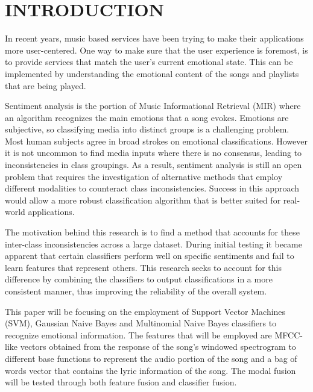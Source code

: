 \renewcommand{\chaptername}{}

\chapter{INTRODUCTION}

In recent years, music based services have been trying to make their 
applications more user-centered. One way to make sure that the 
user experience is foremost, is to provide services that match the user's 
current emotional state. This can be implemented by understanding 
the emotional content of the songs and playlists that are being played. 

Sentiment analysis is the portion of Music Informational Retrieval (MIR) 
where an algorithm recognizes the main emotions that a song evokes. 
Emotions are subjective, so classifying media into distinct groups 
is a challenging problem. Most human subjects agree in broad 
strokes on emotional classifications. However it is not uncommon
 to find media inputs where there is no consensus, leading to 
 inconsistencies in class groupings. As a result, sentiment analysis 
 is still an open problem that requires the investigation of alternative methods that 
 employ different modalities to counteract class inconsistencies.  Success in 
 this approach would allow a more robust classification algorithm 
 that is better suited for real-world applications.
  
  The motivation behind this research is to find a method that accounts for 
  these inter-class inconsistencies across a large dataset.  During initial 
  testing it became apparent that certain classifiers perform well on specific 
  sentiments and fail to learn features that represent others. This 
  research seeks to account for this difference by combining the classifiers 
  to output classifications in a  more consistent manner, thus improving the 
  reliability of the overall system.
  
  This paper will be focusing on the employment of Support Vector Machines (SVM), 
  Gaussian Naive Bayes and Multinomial Naive Bayes classifiers to recognize
  emotional information.  The features that will be employed are MFCC-like 
  vectors obtained from the response of the song's windowed spectrogram 
  to different base functions to  represent the audio portion of the song and 
  a bag of words vector that contains the lyric information of the song.  The modal 
  fusion will be tested through both feature fusion and classifier fusion.
  
